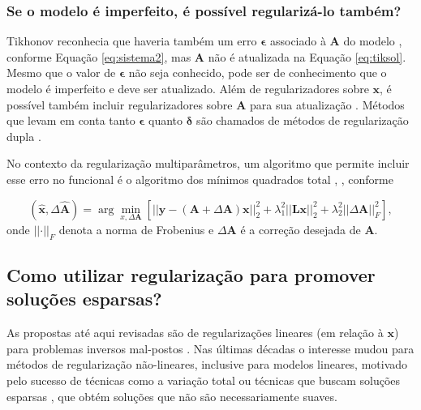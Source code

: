 \subsubsection{Se o modelo é imperfeito, é possível regularizá-lo também?}

Tikhonov reconhecia que haveria também um erro $\bm{\epsilon}$ associado à $\mathbf{A}$ do modelo \cite[pág. 6]{tikhonov1977solutions}, conforme Equação \eqref{eq:sistema2}, mas $\mathbf{A}$ não é atualizada na Equação \eqref{eq:tiksol}. Mesmo que o valor de $\bm{\epsilon}$ não seja conhecido, pode ser de conhecimento que o modelo é imperfeito e deve ser atualizado. Além de regularizadores sobre $\mathbf{x}$, é possível também incluir regularizadores sobre $\mathbf{A}$ para sua atualização \cite{Bleyer2013}.  Métodos que levam em conta tanto $\bm{\epsilon}$ quanto $\bm{\delta}$ são chamados de métodos de regularização dupla \cite[Capítulo 4]{bleyer2015novel}.

No contexto da regularização multiparâmetros, um algoritmo que permite incluir esse erro no funcional é o algoritmo dos mínimos quadrados total \cite[pág. 106]{Arridge2019}, \cite{Golub1999}, conforme

\begin{equation}
\left(\hat{\mathbf{x}}, \Delta\hat{\mathbf{A}} \right) = \arg\min\limits_{x, \Delta\mathbf{A}} \left[ \vert \vert \mathbf{y} - (\mathbf{A}+\Delta\mathbf{A}) \mathbf{x} \vert \vert^2_2 +  \lambda^2_1 \vert \vert \mathbf{L}\mathbf{x} \vert \vert^2_2 +  \lambda^2_2 \vert \vert \Delta\mathbf{A} \vert \vert^2_F \right],
\label{eq:eqmult7}
\end{equation}
onde $\vert\vert \cdot \vert\vert_F$ denota a norma de Frobenius e $\Delta\mathbf{A}$ é a correção desejada de $\mathbf{A}$.

\subsection{Como utilizar regularização para promover soluções esparsas?}
As propostas até aqui revisadas são de regularizações lineares (em relação à $\mathbf{x}$) para problemas inversos mal-postos \cite[pág. 51]{engl1996regularization}. Nas últimas décadas o interesse mudou para métodos de regularização não-lineares, inclusive para modelos lineares, motivado pelo sucesso de técnicas como a variação total ou técnicas que buscam soluções esparsas \cite{Benning2018}, que obtém soluções que não são necessariamente suaves. 

